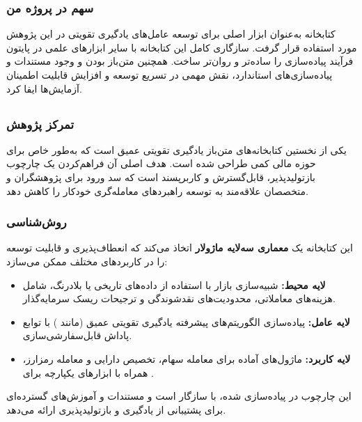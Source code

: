 \documentclass[12pt, a4paper]{report}
\begin{document}
\subsubsection{سهم در پروژه من}
کتابخانه  به‌عنوان ابزار اصلی برای توسعه عامل‌های یادگیری تقویتی در این پژوهش مورد استفاده قرار گرفت. سازگاری کامل این کتابخانه با سایر ابزارهای علمی در پایتون فرآیند پیاده‌سازی را ساده‌تر و روان‌تر ساخت. همچنین متن‌باز بودن و وجود مستندات و پیاده‌سازی‌های استاندارد، نقش مهمی در تسریع توسعه و افزایش قابلیت اطمینان آزمایش‌ها ایفا کرد.


\subsection{ \cite{liu2020finrl}}

\subsubsection{تمرکز پژوهش}
 یکی از نخستین کتابخانه‌های متن‌باز یادگیری تقویتی عمیق است که به‌طور خاص برای حوزه مالی کمی طراحی شده است. هدف اصلی آن فراهم‌کردن یک چارچوب بازتولیدپذیر، قابل‌گسترش و کاربرپسند است که سد ورود برای پژوهشگران و متخصصان علاقه‌مند به توسعه راهبردهای معامله‌گری خودکار را کاهش دهد.  

\subsubsection{روش‌شناسی}
این کتابخانه یک \textbf{معماری سه‌لایه ماژولار} اتخاذ می‌کند که انعطاف‌پذیری و قابلیت توسعه را در کاربردهای مختلف ممکن می‌سازد:
\begin{itemize}
    \item \textbf{لایه محیط:} شبیه‌سازی بازار با استفاده از داده‌های تاریخی یا بلادرنگ، شامل هزینه‌های معاملاتی، محدودیت‌های نقدشوندگی و ترجیحات ریسک سرمایه‌گذار.  
    \item \textbf{لایه عامل:} پیاده‌سازی الگوریتم‌های پیشرفته یادگیری تقویتی عمیق (مانند ) با توابع پاداش قابل‌سفارشی‌سازی.  
    \item \textbf{لایه کاربرد:} ماژول‌های آماده برای معامله سهام، تخصیص دارایی و معامله رمزارز، همراه با ابزارهای یکپارچه برای .  
\end{itemize}

این چارچوب در  پیاده‌سازی شده، با  سازگار است و مستندات و آموزش‌های گسترده‌ای برای پشتیبانی از یادگیری و بازتولیدپذیری ارائه می‌دهد.  
\end{document}
